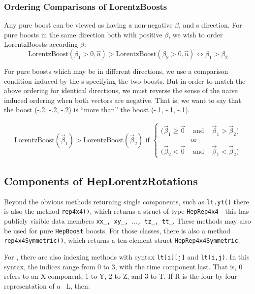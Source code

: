 \subsubsection{Ordering Comparisons of LorentzBoosts}

Any pure boost can be viewed as having a non-negative $\beta$, and s
direction.
For pure boosts in the same direction both with positive $\beta$,
we wish to order LorentzBoosts according $\beta$:
\begin{equation}
\label{ordboost}
  \mbox{LorentzBoost}( \beta_1 > 0, \hat{u} ) >
  \mbox{LorentzBoost}( \beta_2 > 0, \hat{u} ) \Longleftrightarrow
  \beta_1 > \beta_2
\end{equation}

For pure boosts which may be in different directions,
we use a comparison
condition induced by the \SV s specifying the two boosts.
But in order to match the above ordering for identical directions, we must
reverse the sense of the naive induced ordering when both vectors are
negative.  That is, we want to say that the boost (-.2, -.2, -.2) is
``more than'' the boost (-.1, -.1, -.1).

\begin{eqnarray}
  \mbox{LorentzBoost}( \vec{\beta}_1 ) > \mbox{LorentzBoost}( \vec{\beta}_2 )
	\mbox{ if }
\left\{
  \begin{array}{ccc}
  ( \vec{\beta}_1 \geq \vec{0} & \mbox{ and } &
  \vec{\beta}_1 > \vec{\beta}_2 ) \\
	& \mbox{or} \\
  ( \vec{\beta}_2 < \vec{0} & \mbox{ and } &
  \vec{\beta}_1 < \vec{\beta}_2 )
  \end{array}
\right.
\end{eqnarray}


\subsection{Components of HepLorentzRotations}

Beyond the obvious methods returning single components, such as 
{\tt lt.yt()} there is also the method {\tt rep4x4()}, 
which returns a struct of type {\tt HepRep4x4}---this has publicly
visible data members {\tt xx\_, xy\_, $\ldots$, tz\_, tt\_}.  These
methods may also be used for pure {\tt HepBoost} boosts.  For those
classes, there is also a method {\tt rep4x4Symmetric()}, which returns
a ten-element struct {\tt HepRep4x4Symmetric}.

For \LT, there are also indexing methods with syntax
{\tt lt[i][j]} and {\tt lt(i,j)}.  
In this syntax, the indices range from 0 to 3, with the time component last.
That is, 0 refers to an X component, 1 to Y, 2 to Z, and 3 to T.
If R is the four by four representation of a \LT\ L, then:


